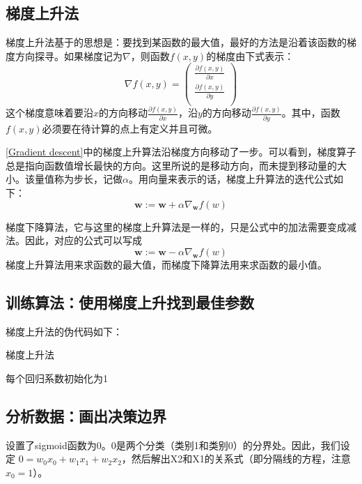 \subsection{梯度上升法}
梯度上升法基于的思想是：要找到某函数的最大值，最好的方法是沿着该函数的梯度方向探寻。如果梯度记为$\nabla$，则函数$f(x,y)$的梯度由下式表示：
\begin{equation*}
    \nabla f(x,y)=
    \left (
    \begin{array}{c}
        \frac{\partial f(x, y)}{\partial x} \\
        \frac{\partial f(x, y)}{\partial y} \\
    \end{array}
    \right )
\end{equation*}
这个梯度意味着要沿$x$的方向移动$\frac{\partial f(x, y)}{\partial x}$，沿$y$的方向移动$\frac{\partial f(x, y)}{\partial y}$。其中，函数$f(x,y)$必须要在待计算的点上有定义并且可微。


\autoref{Gradient descent}中的梯度上升算法沿梯度方向移动了一步。可以看到，梯度算子总是指向函数值增长最快的方向。这里所说的是移动方向，而未提到移动量的大小。该量值称为步长，记做$\alpha$。用向量来表示的话，梯度上升算法的迭代公式如下：
\begin{equation*}
    \bm{w}:=\bm{w}+\alpha\nabla_{\bm{w}}f(w)
\end{equation*}

\begin{tcolorbox}[title=梯度下降]
    梯度下降算法，它与这里的梯度上升算法是一样的，只是公式中的加法需要变成减法。因此，对应的公式可以写成
    \begin{equation*}
        \bm{w}:=\bm{w}-\alpha\nabla_{\bm{w}}f(w)
    \end{equation*}
    梯度上升算法用来求函数的最大值，而梯度下降算法用来求函数的最小值。
\end{tcolorbox}

\subsection{训练算法：使用梯度上升找到最佳参数}
梯度上升法的伪代码如下：
\begin{algorithm}
    \caption{梯度上升法}
    每个回归系数初始化为1\;
\end{algorithm}

\subsection{分析数据：画出决策边界}
设置了sigmoid函数为0。0是两个分类（类别1和类别0）的分界处。因此，我们设定 $0 = w_0x_0 + w_1x_1 +w_2x_2$，然后解出X2和X1的关系式（即分隔线的方程，注意$x_0=1$）。

